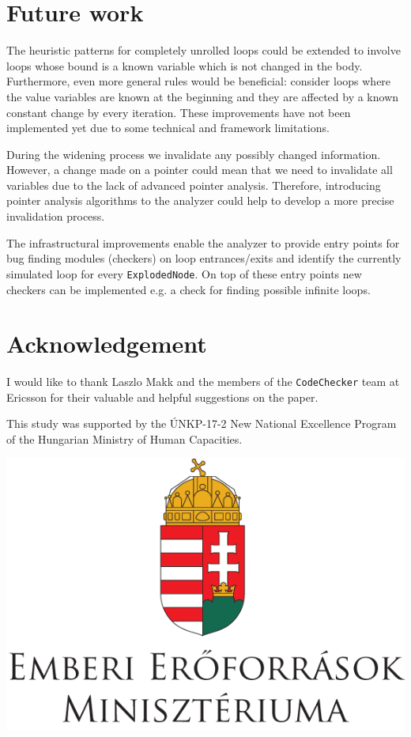\documentclass[oneside, a4paper, 12pt]{article}
\theoremstyle{definition}
\begin{document}
\section{Future work}
The heuristic patterns for completely unrolled loops could be extended to 
involve loops whose bound is a known variable which is not changed in the body. 
Furthermore, even more general rules would be beneficial: consider loops where  
the value variables are known at the beginning and they are affected by a known 
constant change by every iteration. These improvements have not been implemented
yet due to some technical and framework limitations.

During the widening process we invalidate any possibly changed information. 
However, a change made on a pointer could mean that we need to 
invalidate all variables due to the lack of advanced pointer analysis. Therefore, 
introducing pointer analysis algorithms to the analyzer could help to develop a 
more precise invalidation process.

The infrastructural improvements enable the analyzer to provide entry points 
for bug finding modules (checkers) on loop entrances/exits and identify the 
currently simulated loop for every \texttt{ExplodedNode}. On top of these entry 
points new checkers can be implemented e.g. a check for finding possible 
infinite loops.

\section{Acknowledgement}
I would like to thank Laszlo Makk and the members of the \texttt{CodeChecker} 
team at Ericsson for their valuable and helpful suggestions on the paper. 

This study was supported by the \'UNKP-17-2 New National Excellence Program of 
the Hungarian Ministry of Human Capacities.
\begin{center}
	\includegraphics[scale=0.2]{img/unkp}\\
\end{center}


%



\end{document}
